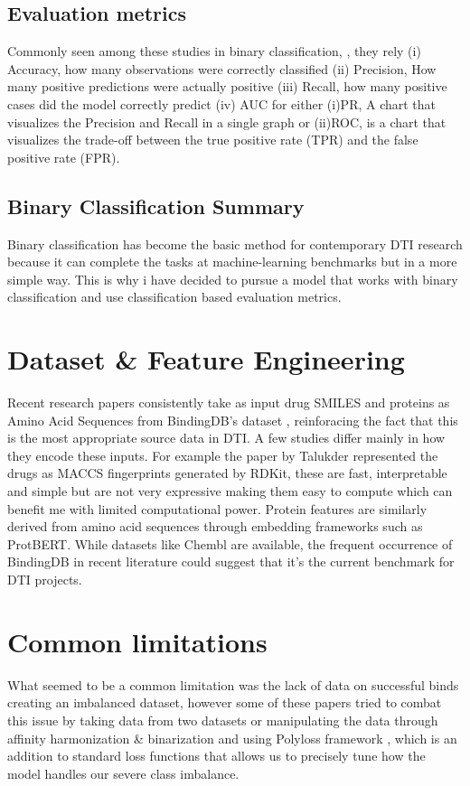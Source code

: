\subsection{Evaluation metrics}
Commonly seen among these studies in binary classification, \citep{DeepLearning, Talukder2025, Ozturk2018}, they rely (i) Accuracy, how many observations were correctly classified (ii) Precision, How many positive predictions were actually positive (iii) Recall, how many positive cases did the model correctly predict (iv) AUC for either (i)PR, A chart that visualizes the Precision and Recall in a single graph or (ii)ROC, is a chart that visualizes the trade-off between the true positive rate (TPR) and the false positive rate (FPR).

\subsection{Binary Classification Summary}
Binary classification has become the basic method for contemporary DTI research because it can complete the tasks at machine-learning benchmarks but in a more simple way. This is why i have decided to pursue a model that works with binary classification and use classification based evaluation metrics.

\section{Dataset \& Feature Engineering}
Recent research papers consistently take as input drug SMILES and proteins as Amino Acid Sequences from BindingDB's dataset \citep{Vefghi2025}, reinforacing the fact that this is the most appropriate source data in DTI. 
A few studies differ mainly in how they encode these inputs. For example the paper by Talukder\citep{Talukder2025} represented the drugs as MACCS fingerprints generated by RDKit, these are fast, interpretable and simple but are not very expressive making them easy to compute which can benefit me with limited computational power. Protein features are similarly derived from amino acid sequences through embedding frameworks such as ProtBERT.
While datasets like Chembl are available, the frequent occurrence of BindingDB in recent literature could suggest that it's the current benchmark for DTI projects.

\section{Common limitations}
What seemed to be a common limitation was the lack of data on successful binds creating an imbalanced dataset, however some of these papers tried to combat this issue by taking data from two datasets \citep{Yang2024} or manipulating the data through affinity harmonization \& binarization \citep{Talukder2025} and using Polyloss framework \citep{Leng2022_proceedings}, which is an addition to standard loss functions that allows us to precisely tune how the model handles our severe class imbalance.

